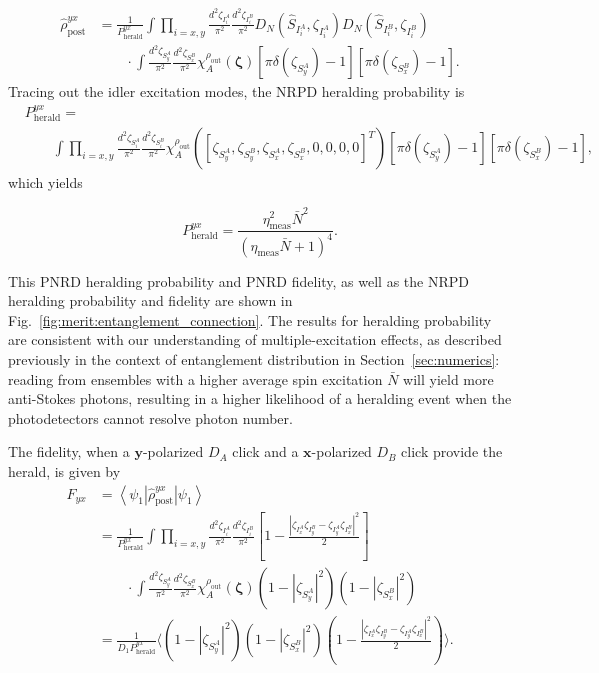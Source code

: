 \documentclass[aps,twocolumn,secnumarabic,amsmath,amssymb,pra,groupedaddress,
showpacs, showkeys]{revtex4-1}
\newcommand{\bra}[1]{\left\langle #1 \right|}
\newcommand{\ket}[1]{\left|#1\right\rangle}
\newcommand{\pna}[1]{\left(#1\right)}
\newcommand{\pnb}[1]{\left[#1\right]}
\newcommand{\eqn}[1]{
\begin{equation}
	#1
\end{equation}
}
\begin{document}
\begin{align}
\hat{\rho}_{\textrm{post}}^{yx}& =
\frac{1}{P_{\textrm{herald}}^{yx}}\int \prod_{i=x,y}
\frac{d^2 \zeta_{I_i^A}}{\pi^2} 
\frac{d^2 \zeta_{I_i^B}}{\pi^2} 
D_N\pna{\hat{S}_{I_i^A},\zeta_{I_i^A}} 
D_N\pna{\hat{S}_{I_i^B},\zeta_{I_i^B}}  \nonumber \\
& \qquad \cdot \int 
\frac{d^2 \zeta_{S_y^A}}{\pi^2} 
\frac{d^2 \zeta_{S_x^B}}{\pi^2}
\chi_A^{\rho_{\textrm{out}}}\pna{\bm{\zeta}} 
\pnb{\pi\delta\pna{\zeta_{S_y^A}}-1}\pnb{\pi\delta\pna{\zeta_{S_x^B}}-1}.
\end{align}
Tracing out the idler excitation modes, the NRPD heralding probability is 
\begin{align}
& P_{\textrm{herald}}^{yx} = \nonumber \\
& \qquad \int 
\prod_{i=x,y}
\frac{d^2 \zeta_{S_i^A}}{\pi^2} 
\frac{d^2 \zeta_{S_i^B}}{\pi^2} \chi_A^{\rho_{\textrm{out}}}\pna{\pnb{\zeta_{S_y^A},\zeta_{S_y^B},\zeta_{S_x^A},\zeta_{S_x^B},0,0,0,0}^T} 
\pnb{\pi\delta\pna{\zeta_{S_y^A}}-1}\pnb{\pi\delta\pna{\zeta_{S_x^B}}-1},
\end{align}
which yields
\eqn{
P_{\textrm{herald}}^{yx} = \frac{\eta ^2_{\textrm{meas}} \bar{N}^2}{(\eta_{\textrm{meas}}  \bar{N}+1)^4}.
}
This PNRD heralding probability and PNRD fidelity, as well as the NRPD
heralding probability and fidelity are shown in
Fig.~\ref{fig:merit:entanglement_connection}. The results for heralding
probability are consistent with our understanding of multiple-excitation
effects, as described previously in the context of entanglement distribution in
Section~\ref{sec:numerics}: reading from ensembles with a higher average spin
excitation $\bar{N}$ will yield more anti-Stokes photons, resulting in a higher
likelihood of a heralding event when the photodetectors cannot resolve photon
number.

The fidelity, when a $\mathbf{y}$-polarized $D_A$ click and a
$\mathbf{x}$-polarized $D_B$ click provide the herald, is given by
\begin{align}
F_{yx} & = \bra{\psi_{1}} \hat{\rho}_{\textrm{post}}^{yx} \ket{\psi_1} \nonumber \\
& =\frac{1}{P_{\textrm{herald}}^{yx}}\int 
\prod_{i=x,y}\frac{d^2 \zeta_{I_i^A}}{\pi^2} 
\frac{d^2 \zeta_{I_i^B}}{\pi^2} 
\pnb{1-\frac{|\zeta_{I_x^A}\zeta_{I_y^B}-\zeta_{I_y^A}\zeta_{I_x^B}|^2}{2}}  \nonumber \\
& \qquad \cdot \int 
\frac{d^2 \zeta_{S_y^A}}{\pi^2} 
\frac{d^2 \zeta_{S_x^B}}{\pi^2}
\chi_A^{\rho_{\textrm{out}}}\pna{\bm{\zeta}} 
\pna{1-|\zeta_{S_y^A}|^2}\pna{1-|\zeta_{S_x^B}|^2} \nonumber \\
& = \frac{1}{D_1 P_{\textrm{herald}}^{yx}}\langle \pna{1-|\zeta_{S_y^A}|^2}\pna{1-|\zeta_{S_x^B}|^2}\pna{1-\frac{|\zeta_{I_x^A}\zeta_{I_y^B}-\zeta_{I_y^A}\zeta_{I_x^B}|^2}{2}}  \rangle.
\end{align}
\end{document}
